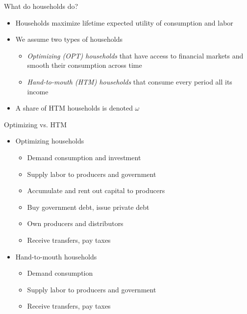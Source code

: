 \begin{frame}{What do households do?}

  \begin{itemize}
    \item Households maximize lifetime expected utility of consumption and labor
    \item We assume two types of households 
    \begin{itemize}
      \item \emph{Optimizing (OPT) households} that have access to financial markets and smooth their consumption across time
      \item \emph{Hand-to-mouth (HTM) households} that consume every period all its income
    \end{itemize}
    \item A share of HTM households is denoted $\omega$
  \end{itemize}

\end{frame}

\begin{frame}{Optimizing vs. HTM}

  \begin{itemize}
    \item Optimizing households
    \begin{itemize}
      \item Demand consumption and investment
      \item Supply labor to producers and government
      \item Accumulate and rent out capital to producers
      \item Buy government debt, issue private debt
      \item Own producers and distributors
      \item Receive transfers, pay taxes
    \end{itemize}
    \item Hand-to-mouth households
    \begin{itemize}
      \item Demand consumption
      \item Supply labor to producers and government
       \item Receive transfers, pay taxes
    \end{itemize}
      
  \end{itemize}
 \end{frame}

